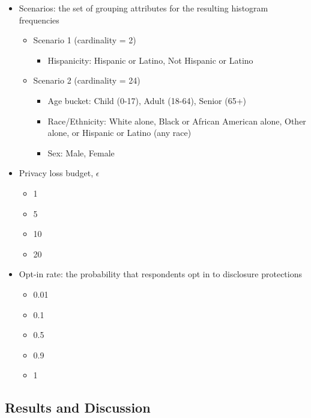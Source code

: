\documentclass[
]{urban-formatting}
\providecommand{\tightlist}{%
  \setlength{\itemsep}{0pt}\setlength{\parskip}{0pt}}\usepackage{longtable,booktabs,array}
\begin{document}
\begin{itemize}
\tightlist
\item
  Scenarios: the set of grouping attributes for the resulting histogram
  frequencies

  \begin{itemize}
  \tightlist
  \item
    Scenario 1 (cardinality = 2)

    \begin{itemize}
    \tightlist
    \item
      Hispanicity: Hispanic or Latino, Not Hispanic or Latino
    \end{itemize}
  \item
    Scenario 2 (cardinality = 24)

    \begin{itemize}
    \item
      Age bucket: Child (0-17), Adult (18-64), Senior (65+)
    \item
      Race/Ethnicity: White alone, Black or African American alone,
      Other alone, or Hispanic or Latino (any race)
    \item
      Sex: Male, Female
    \end{itemize}
  \end{itemize}
\item
  Privacy loss budget, \(\epsilon\)

  \begin{itemize}
  \tightlist
  \item
    1
  \item
    5
  \item
    10
  \item
    20
  \end{itemize}
\item
  Opt-in rate: the probability that respondents opt in to disclosure
  protections

  \begin{itemize}
  \item
    0.01
  \item
    0.1
  \item
    0.5
  \item
    0.9
  \item
    1
  \end{itemize}
\end{itemize}

\subsection{Results and Discussion}
\end{document}
